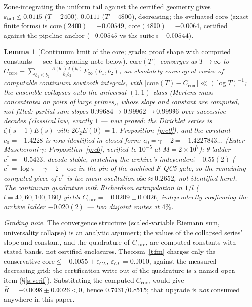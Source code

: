 \documentclass[11pt]{article}
\numberwithin{equation}{section}
\newtheorem{lemma}[theorem]{Lemma}
\theoremstyle{definition}
\theoremstyle{remark}
\newcommand{\LL}{\Lambda}
\begin{document}
\noindent Zone-integrating the uniform tail against the certified
geometry gives $\varepsilon_{\mathrm{tail}}\le0.0115$
($T=2400$), $0.0111$ ($T=4800$), decreasing; the evaluated core
(exact finite forms) is $\mathrm{core}(2400)=-0.00549$,
$\mathrm{core}(4800)=-0.0064$, certified against the pipeline
anchor ($-0.00545$ vs the suite's $-0.00544$).

\begin{lemma}[Continuum limit of the core; grade: proof shape
with computed constants --- see the grading note
below]\label{l:CL}
$\mathrm{core}(T)$ converges as $T\to\infty$ to
$C_{\mathrm{core}}=\sum_{b_1\le b_2}\frac{\LL(b_1)\LL(b_2)}
{b_1b_2}F_\infty(b_1,b_2)$, an absolutely convergent series of
computable continuum sawtooth integrals, with
$|\mathrm{core}(T)-C_{\mathrm{core}}|\ll(\log T)^{-1}$; the
ensemble collapses onto the universal $(1,1)$-class (Mertens mass
concentrates on pairs of large primes), whose slope and constant
are computed, not fitted: partial-sum slopes
$0.99684\to0.99962\to0.99996$ over successive decades (classical
law, exactly $1$ --- now \emph{proved}: the Dirichlet series is
$\zeta(s+1)E(s)$ with $2C_2E(0)=1$, Proposition~\ref{p:c0}),
and the constant $c_0=-1.4228$ is now \emph{identified in closed
form}: $c_0=\gamma-2=-1.4227843\ldots$ (Euler--Mascheroni
$\gamma$; Proposition~\ref{p:c0}, verified to $10^{-5}$ at
$M=2\times10^{7}$); $\theta$-ladder $c^{*}=-0.5433$,
decade-stable, matching the archive's independent $-0.55(2)$
($c^{*}=\log\pi+\gamma-2-\overline{\mathrm{osc}}$ in the pin of
the archived F-QC5 gate, so the remaining computed piece of
$c^{*}$ is the mean oscillation
$\overline{\mathrm{osc}}\approx0.2652$, not identified here). The continuum quadrature with Richardson
extrapolation in $1/l$ ($l=40,60,100,160$) yields
$C_{\mathrm{core}}=-0.0209\pm0.0026$, independently confirming
the archive ladder $-0.020(2)$ --- two disjoint routes at $4\%$.
\end{lemma}

\noindent\emph{Grading note.} The convergence structure
(scaled-variable Riemann sum, universality collapse) is an
analytic argument; the values of the collapsed series' slope and
constant, and the quadrature of $C_{\mathrm{core}}$, are
computed constants with stated bands, not certified enclosures.
Theorem~\ref{t:fm} charges only the conservative
$\mathrm{core}\le-0.0055+\varepsilon_{CL}$,
$\varepsilon_{CL}=0.0010$, against the measured decreasing grid;
the certification write-out of the quadrature is a named open
item (\S\ref{s:verif}). Substituting the computed
$C_{\mathrm{core}}$ would give $\bar R=-0.0098\pm0.0026<0$,
hence $0.7031/0.8515$; that upgrade is \emph{not} consumed
anywhere in this paper.
\end{document}
